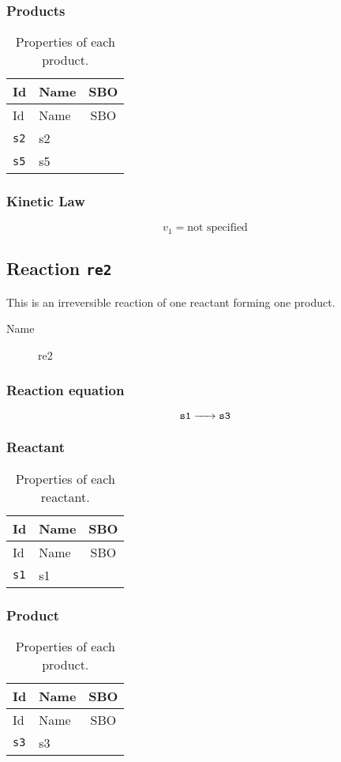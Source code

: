 \documentclass[11pt,twoside,a4paper]{scrartcl}
\newcommand{\reaction}[1]{\begin{equation}\ce{#1}\end{equation}}
\begin{document}
\subsubsection*{Products}
\begin{longtable}[h!]{llc}
\caption{Properties of each product.}\\
\toprule
Id & Name & SBO\\
\midrule
\endfirsthead
\toprule
Id & Name & SBO\\
\midrule
\endhead
\texttt{s2}&s2&\\
\texttt{s5}&s5&\\
\bottomrule\end{longtable}

\subsubsection*{Kinetic Law}

\begin{dmath}
v_{1}=\text{not specified}
\label{v1}
\end{dmath}

\subsection{Reaction \texttt{re2}}
This is an irreversible reaction of one reactant forming one product.\begin{description}
\item[Name] re2
\end{description}

\subsubsection*{Reaction equation}
\reaction{ $\mathtt{s1}$ ->  $\mathtt{s3}$}

\subsubsection*{Reactant}
\begin{longtable}[h!]{llc}
\caption{Properties of each reactant.}\\
\toprule
Id & Name & SBO\\
\midrule
\endfirsthead
\toprule
Id & Name & SBO\\
\midrule
\endhead
\texttt{s1}&s1&\\
\bottomrule\end{longtable}

\subsubsection*{Product}
\begin{longtable}[h!]{llc}
\caption{Properties of each product.}\\
\toprule
Id & Name & SBO\\
\midrule
\endfirsthead
\toprule
Id & Name & SBO\\
\midrule
\endhead
\texttt{s3}&s3&\\
\bottomrule\end{longtable}
\end{document}
